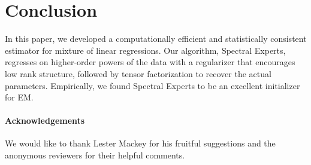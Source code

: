 \section{Conclusion}
\label{sec:conclusion}

In this paper, we developed a computationally efficient and statistically
consistent estimator for mixture of linear regressions.
Our algorithm, Spectral
Experts, regresses on higher-order powers of the data with a regularizer that
encourages low rank structure, followed by tensor factorization to recover the
actual parameters.  Empirically, we found Spectral Experts 
to be an excellent initializer for EM.

\paragraph{Acknowledgements}
We would like to thank Lester Mackey for his fruitful suggestions and
the anonymous reviewers for their helpful comments.
